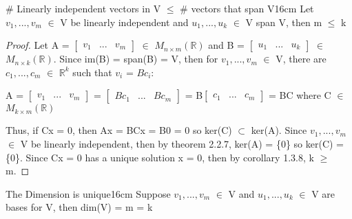     \vspace{0.5cm}



    \begin{wtheorem}{\# Linearly independent vectors in V $\leq$
    \# vectors that span V}{16cm}
        Let $v_1,...,v_m$ $\in$ V be linearly independent
        and $u_1,...,u_k$ $\in$ V span V, then m $\leq$ k
    \end{wtheorem}

    \begin{proof}
        Let A =
        $\begin{bmatrix}
            v_1 & ... & v_m
        \end{bmatrix}$ $\in$ $M_{n \times m}(\mathbb{R})$
        and B =
        $\begin{bmatrix}
            u_1 & ... & u_k
        \end{bmatrix}$ $\in$ $M_{n \times k}(\mathbb{R})$.
        Since im(B) = span(B) = V, then for $v_1,...,v_m$ $\in$ V, there are
        $c_1,...,c_m$ $\in$ $\mathbb{R}^k$ such that $v_i$ = $Bc_i$:

        \hspace{0.5cm}
        A =
        $\begin{bmatrix}
            v_1 & ... & v_m
        \end{bmatrix}$ =
        $\begin{bmatrix}
            Bc_1 & ... & Bc_m
        \end{bmatrix}$ =
        B$\begin{bmatrix}
            c_1 & ... & c_m
        \end{bmatrix}$
        = BC
        \hspace{0.5cm}
        where C $\in$ $M_{k \times m}(\mathbb{R})$

        Thus, if Cx = 0, then Ax = BCx = B0 = 0 so ker(C) $\subset$ ker(A).
        Since $v_1,...,v_m$ $\in$ V be linearly independent, then by
        {\color{red} theorem 2.2.7}, ker(A) = \{0\} so ker(C) = \{0\}.
        Since Cx = 0 has a unique solution x = 0, then by
        {\color{orange} corollary 1.3.8}, k $\geq$ m.
    \end{proof}

    \vspace{0.5cm}



    \begin{corollary}{The Dimension is unique}{16cm}
        Suppose $v_1,...,v_m$ $\in$ V and
        $u_1,...,u_k$ $\in$ V are bases for V, then dim(V) = m = k
    \end{corollary}

